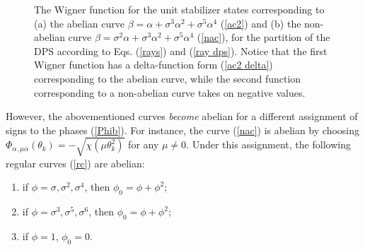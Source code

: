 \documentclass[quantumrep,article,submit,pdftex,moreauthors]{Definitions/mdpi}
\begin{document}
\begin{figure}[ht]%
    \centering
	\quad
	\caption{
		The Wigner function for the unit stabilizer states corresponding to (a)
		the abelian curve $\beta = \alpha + \sigma^3 \alpha^2 + \sigma^5
		\alpha^4$ (\ref{ac2}) and (b) the non-abelian curve $\beta = \sigma^2
		\alpha + \sigma^3 \alpha^2 + \sigma^{5}\alpha^{4}$ (\ref{nac}), for the
		partition of the DPS according to Eqs. (\ref{rays}) and (\ref{ray dps}).
		Notice that the first Wigner function has a delta-function form
		(\ref{ac2 delta}) corresponding to the abelian curve, while the second
		function corresponding to a non-abelian curve takes on negative values.
	}%
    \label{fig1}%
\end{figure}

However, the abovementioned curves \textit{become} abelian for a different
assignment of signs to the phases (\ref{Phib}). For instance, the curve
(\ref{nac}) is abelian by choosing $\Phi_{\alpha,\mu \alpha }(\theta_{k}) =
-\sqrt{\chi\left(\mu \theta_{k}^{2}\right)}$ for any $\mu \neq 0$. Under this
assignment, the following regular curves (\ref{rc}) are abelian:

\begin{enumerate}
  \item if $\phi = \sigma, \sigma^{2}, \sigma^{4}$, then $\phi_{0} = \phi +
    \phi^{2}$;
  \item if $\phi = \sigma^{3}, \sigma^{5}, \sigma^{6}$, then $\phi_{0} = \phi +
  \phi^{2}$;
  \item if $\phi = 1$, $\phi_{0} = 0$.
\end{enumerate}
\end{document}
